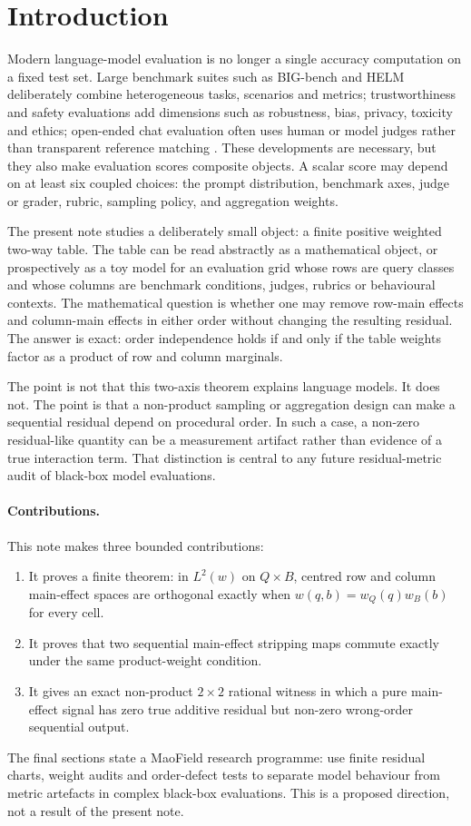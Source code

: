 \documentclass[11pt]{article}
\theoremstyle{remark}
\begin{document}
\section{Introduction}

Modern language-model evaluation is no longer a single accuracy computation on a fixed test set. Large benchmark suites such as BIG-bench and HELM deliberately combine heterogeneous tasks, scenarios and metrics; trustworthiness and safety evaluations add dimensions such as robustness, bias, privacy, toxicity and ethics; open-ended chat evaluation often uses human or model judges rather than transparent reference matching \cite{bigbench2022,helm2022,decodingtrust2023,mtbench2023}. These developments are necessary, but they also make evaluation scores composite objects. A scalar score may depend on at least six coupled choices: the prompt distribution, benchmark axes, judge or grader, rubric, sampling policy, and aggregation weights.

The present note studies a deliberately small object: a finite positive weighted two-way table. The table can be read abstractly as a mathematical object, or prospectively as a toy model for an evaluation grid whose rows are query classes and whose columns are benchmark conditions, judges, rubrics or behavioural contexts. The mathematical question is whether one may remove row-main effects and column-main effects in either order without changing the resulting residual. The answer is exact: order independence holds if and only if the table weights factor as a product of row and column marginals.

The point is not that this two-axis theorem explains language models. It does not. The point is that a non-product sampling or aggregation design can make a sequential residual depend on procedural order. In such a case, a non-zero residual-like quantity can be a measurement artifact rather than evidence of a true interaction term. That distinction is central to any future residual-metric audit of black-box model evaluations.

\paragraph{Contributions.}
This note makes three bounded contributions:
\begin{enumerate}[leftmargin=*,itemsep=2pt]
\item It proves a finite theorem: in $L^2(w)$ on $Q\times B$, centred row and column main-effect spaces are orthogonal exactly when $w(q,b)=w_Q(q)w_B(b)$ for every cell.
\item It proves that two sequential main-effect stripping maps commute exactly under the same product-weight condition.
\item It gives an exact non-product $2\times2$ rational witness in which a pure main-effect signal has zero true additive residual but non-zero wrong-order sequential output.
\end{enumerate}
The final sections state a MaoField research programme: use finite residual charts, weight audits and order-defect tests to separate model behaviour from metric artefacts in complex black-box evaluations. This is a proposed direction, not a result of the present note.
\end{document}
